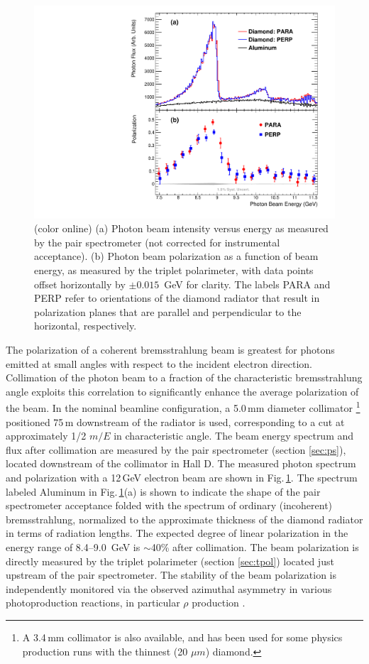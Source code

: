 \begin{figure}[tbp]
\begin{center}
 \includegraphics[clip=true,width=0.5\linewidth]{figures/gx3102_pi0etaAsym2016_fig0_beam.pdf}
\end{center}
\caption{(color online) (a) Photon beam intensity versus energy as measured by the pair spectrometer
(not corrected for instrumental acceptance).  (b) Photon beam polarization as a function of beam energy,
as measured by the triplet polarimeter, with data points offset horizontally by $\pm0.015$~GeV for clarity.
The labels PARA and PERP refer to orientations of the diamond radiator that result in polarization
planes that are parallel and perpendicular to the horizontal, respectively.
        }
\label{fig:beam:gx3102_pi0etaAsym2016_fig0_beam} 
\end{figure}

The polarization of a coherent bremsstrahlung beam is greatest for photons emitted at small
angles with respect to the incident electron direction. Collimation of the photon beam to a fraction
of the characteristic brems\-strah\-lung angle exploits this correlation to significantly enhance
the average polarization of the beam. 
In the nominal \GX{} beamline configuration, a 5.0\,mm diameter collimator
\footnote{A 3.4\,mm collimator is also available, and has been used for some physics production runs
with the thinnest (20 $\mu m$) diamond.}
positioned 75\,m downstream of the radiator is used, corresponding to a cut at approximately
1/2 $m/E$ in characteristic angle. The beam energy spectrum and flux after collimation are measured
by the pair spectrometer (section \ref{sec:ps}), located downstream of the collimator in Hall D. The
measured photon spectrum and polarization with a 12\,GeV electron beam are
shown in Fig.\,\ref{fig:beam:gx3102_pi0etaAsym2016_fig0_beam}. The spectrum labeled Aluminum in 
Fig.\,\ref{fig:beam:gx3102_pi0etaAsym2016_fig0_beam}(a) is shown to indicate the shape of the 
pair spectrometer acceptance folded with the spectrum of ordinary (incoherent) brems\-strah\-lung,
normalized to the approximate thickness of the diamond radiator in terms of radiation lengths.
The expected degree of linear polarization in the energy range of 8.4--9.0~GeV is $\sim$40\% after
collimation.  The beam polarization is directly measured by the triplet polarimeter (section \ref{sec:tpol})
located just upstream of the pair spectrometer. The stability of the beam polarization is independently
monitored via the observed azimuthal asymmetry in various photoproduction reactions, in particular
$\rho$ production \cite{gx3076}.

